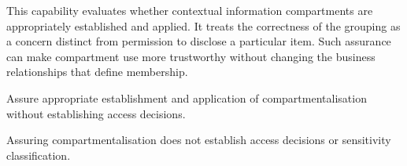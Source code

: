 This capability evaluates whether contextual information compartments are appropriately established and applied. It treats the correctness of the grouping as a concern distinct from permission to disclose a particular item. Such assurance can make compartment use more trustworthy without changing the business relationships that define membership.



Assure appropriate establishment and application of compartmentalisation without establishing access decisions.



Assuring compartmentalisation does not establish access decisions or sensitivity classification.



